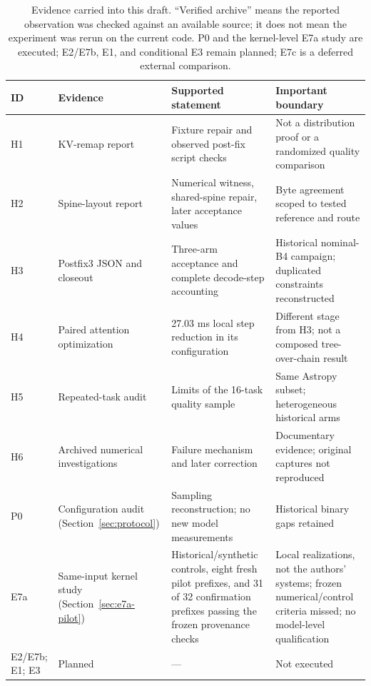 \documentclass[conference]{IEEEtran}
\begin{document}
\begin{table}[t]
\caption{Evidence carried into this draft. ``Verified archive'' means the reported observation was checked against an available source; it does not mean the experiment was rerun on the current code. P0 and the kernel-level E7a study are executed; E2/E7b, E1, and conditional E3 remain planned; E7c is a deferred external comparison.}
\label{tab:evidence}
\centering\footnotesize
\begin{tabularx}{\textwidth}{@{}p{}p{}Yp{0.25\textwidth}@{}}
\toprule
ID & Evidence & Supported statement & Important boundary \\
\midrule
H1 & KV-remap report~\cite{lumo2026stateless} & Fixture repair and observed post-fix script checks & Not a distribution proof or a randomized quality comparison \\
H2 & Spine-layout report~\cite{lumo2026spine} & Numerical witness, shared-spine repair, later acceptance values & Byte agreement scoped to tested reference and route \\
H3 & Postfix3 JSON and closeout~\cite{lumo2026archive} & Three-arm acceptance and complete decode-step accounting & Historical nominal-B4 campaign; duplicated constraints reconstructed \\
H4 & Paired attention optimization~\cite{lumo2026paired} & 27.03 ms local step reduction in its configuration & Different stage from H3; not a composed tree-over-chain result \\
H5 & Repeated-task audit~\cite{lumo2026archive} & Limits of the 16-task quality sample & Same Astropy subset; heterogeneous historical arms \\
H6 & Archived numerical investigations & Failure mechanism and later correction & Documentary evidence; original captures not reproduced \\
P0 & Configuration audit (Section~\ref{sec:protocol}) & Sampling reconstruction; no new model measurements & Historical binary gaps retained \\
E7a & Same-input kernel study (Section~\ref{sec:e7a-pilot}) & Historical/synthetic controls, eight fresh pilot prefixes, and 31 of 32 confirmation prefixes passing the frozen provenance checks & Local realizations, not the authors' systems; frozen numerical/control criteria missed; no model-level qualification \\
E2/E7b; E1; E3 & Planned & --- & Not executed \\
\bottomrule
\end{tabularx}
\end{table}
\end{document}
